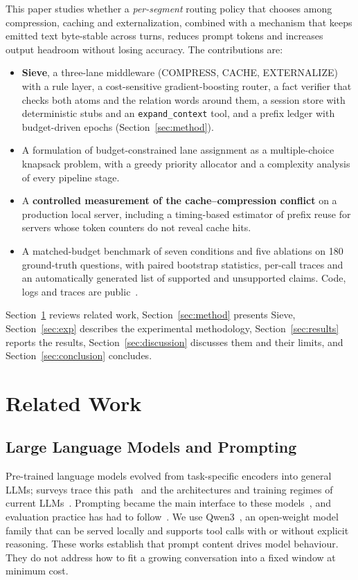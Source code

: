 \documentclass[journal]{IEEEtran}
\begin{document}
This paper studies whether a \emph{per-segment} routing policy that chooses among compression, caching and externalization,
combined with a mechanism that keeps emitted text byte-stable across turns, reduces prompt tokens and increases output headroom
without losing accuracy. The contributions are:
\begin{itemize}
\item \textbf{Sieve}, a three-lane middleware (COMPRESS, CACHE, EXTERNALIZE) with a rule layer, a cost-sensitive
gradient-boosting router, a fact verifier that checks both atoms and the relation words around them, a session store with
deterministic stubs and an \texttt{expand\_context} tool, and a prefix ledger with budget-driven epochs (Section~\ref{sec:method}).
\item A formulation of budget-constrained lane assignment as a multiple-choice knapsack problem, with a greedy priority allocator
and a complexity analysis of every pipeline stage.
\item A \textbf{controlled measurement of the cache--compression conflict} on a production local server, including a
timing-based estimator of prefix reuse for servers whose token counters do not reveal cache hits.
\item A matched-budget benchmark of seven conditions and five ablations on 180 ground-truth questions, with paired bootstrap
statistics, per-call traces and an automatically generated list of supported and unsupported claims. Code, logs and traces are
public~\cite{sieve2026code}.
\end{itemize}
Section~\ref{sec:related} reviews related work, Section~\ref{sec:method} presents Sieve, Section~\ref{sec:exp} describes the
experimental methodology, Section~\ref{sec:results} reports the results, Section~\ref{sec:discussion} discusses them and their
limits, and Section~\ref{sec:conclusion} concludes.

\section{Related Work}\label{sec:related}
\subsection{Large Language Models and Prompting}
Pre-trained language models evolved from task-specific encoders into general LLMs; surveys trace this
path~\cite{qiu2020ptm,han2021ptm,min2023recent} and the architectures and training regimes of current
LLMs~\cite{naveed2025overview,raiaan2024review,yang2024harnessing,lin2022transformers}. Prompting became the main interface to
these models~\cite{liu2023prompting,chen2025promptengineering}, and evaluation practice has had to follow~\cite{chang2024evaluation}.
We use Qwen3~\cite{qwen3}, an open-weight model family that can be served locally and supports tool calls with or without
explicit reasoning. These works establish that prompt content drives model behaviour. They do not address how to fit a growing
conversation into a fixed window at minimum cost.
\end{document}
